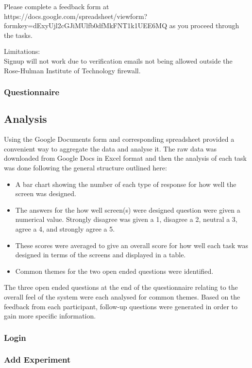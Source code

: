 Please complete a feedback form at https://docs.google.com/spreadsheet/viewform?formkey=dExyUjl2cGJiMUlfb0dfMkFNT1k1UEE6MQ as you proceed through the tasks.

Limitations:\\
Signup will not work due to verification emails not being allowed outside the Rose-Hulman Institute of Technology firewall.

\subsubsection{Questionnaire}


\subsection{Analysis}
Using the Google Documents form and corresponding spreadsheet provided a convenient way to aggregate the data and analyse it. The raw data was downloaded from Google Docs in Excel format and then the analysis of each task was done following the general structure outlined here:
\begin{itemize}
\item A bar chart showing the number of each type of response for how well the screen was designed.
\item The answers for the how well screen(s) were designed question were given a numerical value. Strongly disagree was given a 1, disagree a 2, neutral a 3, agree a 4, and strongly agree a 5. 
\item These scores were averaged to give an overall score for how well each task was designed in terms of the screens and displayed in a table.
\item Common themes for the two open ended questions were identified.
\end{itemize}
The three open ended questions at the end of the questionnaire relating to the overall feel of the system were each analysed for common themes. Based on the feedback from each participant, follow-up questions were generated in order to gain more specific information.

\subsubsection{Login}

\subsubsection{Add Experiment}

